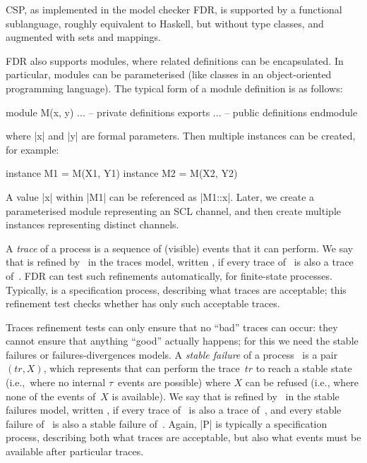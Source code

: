 CSP, as implemented in the model checker FDR, is supported by a functional
sublanguage, roughly equivalent to Haskell, but without type classes, and
augmented with sets and mappings.  

FDR also supports modules, where related definitions can be encapsulated.  In
particular, modules can be parameterised (like classes in an object-oriented
programming language).  The typical form of a module definition is as follows:
\begin{cspm}
module M(x, y)
  ... -- private definitions
exports
  ... -- public definitions
endmodule
\end{cspm}
where |x| and |y| are formal parameters.
%
Then  multiple instances can be created, for example:
\begin{cspm}
instance M1 = M(X1, Y1)
instance M2 = M(X2, Y2)
\end{cspm}
%
A value |x| within |M1| can be referenced as |M1::x|.
Later, we create a parameterised module representing an SCL channel, and then
create multiple instances representing distinct channels.
 
A \emph{trace} of a process is a sequence of (visible) events that it
can perform.  We say that  is refined by~ in the traces model,
written \CSPM{P [T= Q}, if every trace of~ is also a trace
of~\@.  FDR can test such refinements automatically, for finite-state
processes.  Typically,  is a specification process, describing what
traces are acceptable; this refinement test checks whether  has only such
acceptable traces.  

Traces refinement tests can only ensure that no ``bad'' traces can occur: they
cannot ensure that anything ``good'' actually happens; for this we need the
stable failures or failures-divergences models.  A \emph{stable failure} of a
process~ is a pair $(tr,X)$, which represents that  can
perform the trace~$tr$ to reach a stable state (i.e.,~where no internal
$\tau$~events are possible) where $X$ can be refused (i.e., where none of the
events of~$X$ is available).  We say that  is refined by~ in
the stable failures model, written \CSPM{P [F= Q}, if every trace of~
is also a trace of~, and every stable failure of~ is also a
stable failure of~.  Again, |P| is typically a specification process,
describing both what traces are acceptable, but also what events must be
available after particular traces.

